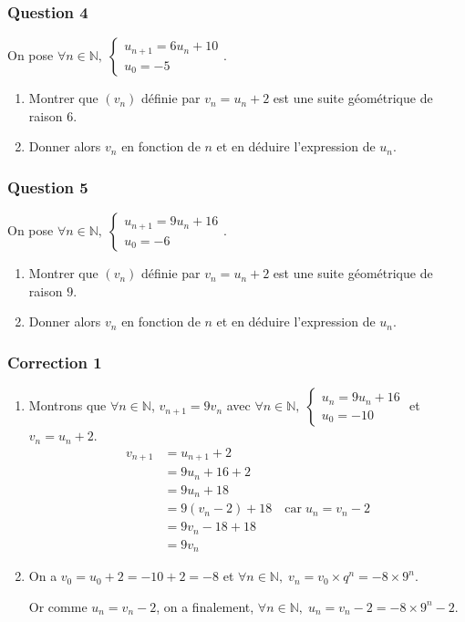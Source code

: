 \documentclass[15pt, mathserif]{beamer}
\begin{document}
\begin{frame} 
	\frametitle{Question 4}


On pose $\forall n \in \mathbb{N}, \;\begin{cases} u_{n+1} = 6u_n+10 \\ u_0 = -5\end{cases}$.

\begin{enumerate}
	\item Montrer que $(v_n)$ définie par $v_n = u_n+2$ est une suite géométrique de raison $6$.

	\item Donner alors $v_n$ en fonction de $n$ et en déduire l'expression de $u_n$.

\end{enumerate}\end{frame}


\begin{frame} 
	\frametitle{Question 5}


On pose $\forall n \in \mathbb{N}, \;\begin{cases} u_{n+1} = 9u_n+16 \\ u_0 = -6\end{cases}$.

\begin{enumerate}
	\item Montrer que $(v_n)$ définie par $v_n = u_n+2$ est une suite géométrique de raison $9$.

	\item Donner alors $v_n$ en fonction de $n$ et en déduire l'expression de $u_n$.

\end{enumerate}\end{frame}


\begin{frame}
\vspace{-10mm}
	\frametitle{Correction 1}
\vspace{0.5cm}\begin{enumerate}
	\item  Montrons que $\forall n \in \mathbb{N}$, $v_{n+1} = 9v_n$ avec $\forall n \in \mathbb{N}, \; \begin{cases}u_n = 9u_n+16\\ u_0 = -10\end{cases}$ et $v_n = u_n +2$.
	\begin{align*}
		v_{n+1} &= u_{n+1}+2\\
		&=9u_n+16+2\\
		&=9u_n+18\\
		&=9(v_n-2)+18 \quad \text{car} \; u_n = v_n-2\\
		&=9v_n-18+18\\
		&=9v_n
	\end{align*}
		\item On a $v_0 = u_0+2=-10+2=-8$ et $\forall n \in \mathbb{N}, \; v_n = v_0 \times q^n  = -8\times9^n$.

		Or comme $u_n = v_n-2$, on a finalement, $\forall n \in \mathbb{N}, \; u_n = v_n-2= -8\times9^n-2$.
\end{enumerate}\end{frame}
\end{document}
